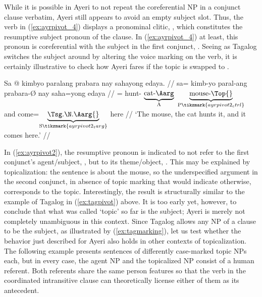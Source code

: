 While it is possible in Ayeri to not repeat the coreferential NP in a conjunct
clause verbatim, Ayeri still appears to avoid an empty subject slot. Thus, the
verb  in (\ref{ex:ayrpivot_4}) displays a
pronominal clitic, , which constitutes the resumptive
subject pronoun of the clause. In (\ref{ex:ayrpivot_4}) at least, this pronoun
is coreferential with the subject in the first conjunct,
. Seeing as Tagalog switches the subject around by
altering the voice marking on the verb, it is certainly illustrative to check
how Ayeri fares if the topic is swapped to .

\ex\label{ex:ayrpivot2}
\begingl[aboveglftskip=1em]
	\gla Sa @ kimbyo paralang prabara nay sahayong edaya. //
	\glb sa= kimb-yo paral-ang prabara-Ø nay saha=yong edaya  //
	\glc \PatT{}= hunt-\TsgN{}
		$\underbrace{\text{cat-\Aarg}}_{\text{A}}$
		$\underbrace{\text{mouse-\Top{}}}_{\text{P}\tikzmark{ayrpivot2_ctrl}}$
		and
		come=$\underbrace{\text{\smash{\TsgN{}}.\Aarg{}}}_%
			{\text{S}\tikzmark{ayrpivot2_targ}}$
		here //
	\glft `The mouse, the cat hunts it, and it comes here.' //
\endgl

\xe

In (\ref{ex:ayrpivot2}), the resumptive pronoun is indicated to not refer to
the first conjunct's agent/subject, , but to its
theme/object, . This may be explained by topicalization:
the sentence is about the mouse, so the underspecified argument in the second
conjunct, in absence of topic marking that would indicate otherwise,
corresponds to the topic. Interestingly, the result is structurally similar to
the example of Tagalog in (\ref{ex:tagpivot}) above. It is too early yet,
however, to conclude that what was called `topic' so far is the subject; Ayeri
is merely not completely unambiguous in this context. Since Tagalog allows any
NP of a clause to be the subject, as illustrated by (\ref{ex:tagmarking}), let
us test whether the behavior just described for Ayeri also holds in other
contexts of topicalization. The following example presents sentences of
differently case-marked topic NPs each, but in every case, the agent NP and the
topicalized NP consist of a human referent. Both referents share the same
person features so that the verb in the coordinated intransitive clause can
theoretically license either of them as its antecedent.

